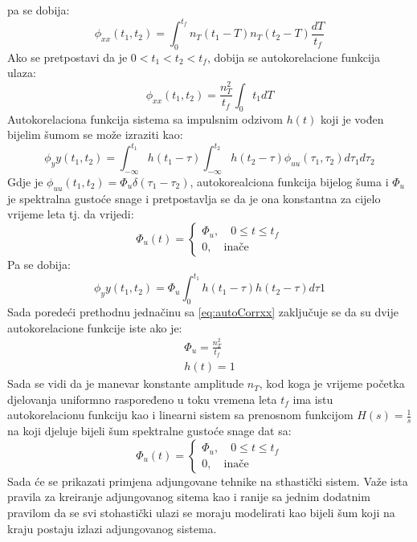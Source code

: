 pa se dobija:
\begin{equation}
    \phi_{xx}(t_1,t_2)=\int_{0}^{t_f}n_T(t_1-T)n_T(t_2-T)\frac{dT}{t_f}
\end{equation}
Ako se pretpostavi da je $0<t_1<t_2<t_f$, dobija se autokorelacione funkcija ulaza:
\begin{equation}
    \phi_{xx}(t_1,t_2)=\frac{n_T^2}{t_f}\int_{0}{t_1}dT
    \label{eq:autoCorrxx}
\end{equation}
Autokorelaciona funkcija sistema sa impulsnim odzivom $h(t)$ koji je vođen bijelim 
šumom se može izraziti kao:
\begin{equation}
    \phi_yy(t_1,t_2)=\int_{-\infty}^{t_1}h(t_1-\tau)\int_{-\infty}^{t_2}h(t_2-\tau)\phi_{uu}(\tau_1,\tau_2)d\tau_1d\tau_2
\end{equation}
Gdje je $\phi_{uu}(t_1,t_2)= \Phi_u\delta(\tau_1-\tau_2)$, autokorealciona funkcija bijelog šuma
i $\Phi_u$ je spektralna gustoće snage i pretpostavlja se da je ona konstantna za cijelo vrijeme leta tj. da vrijedi:
\begin{equation}
    \Phi_u(t) = \begin{cases}
        \Phi_u, \quad 0 \leq t \leq t_f \\
        0, \quad \text{inače} 
    \end{cases}
\end{equation}
Pa se dobija:
\begin{equation}
    \phi_yy(t_1,t_2) = \Phi_u\int_0^{t_1}h(t_1-\tau)h(t_2-\tau)d\tau1
\end{equation}
Sada poredeći prethodnu jednačinu sa \ref{eq:autoCorrxx} zaključuje se da 
su dvije autokorelacione funkcije iste ako je: 
\begin{eqnarray}
    \Phi_u =\frac{n_T^2}{t_f} \\
    h(t)=1
\end{eqnarray}
Sada se vidi da je manevar konstante amplitude $n_T$, kod koga je vrijeme 
početka djelovanja uniformno raspoređeno u toku vremena leta $t_f$ ima istu 
autokorelacionu funkciju kao i linearni sistem sa prenosnom funkcijom $H(s)=\frac{1}{s}$ 
na koji djeluje bijeli šum spektralne gustoće snage dat sa: 
\begin{equation*}
    \Phi_u(t) = \begin{cases}
        \Phi_u, \quad 0 \leq t \leq t_f \\
        0, \quad \text{inače}
    \end{cases}
\end{equation*}
Sada će se prikazati primjena adjungovane tehnike na sthastički sistem. Važe ista pravila 
za kreiranje adjungovanog sitema kao i ranije sa jednim dodatnim pravilom da se 
svi stohastički ulazi se moraju modelirati kao bijeli šum koji na kraju postaju 
izlazi adjungovanog sistema. 



